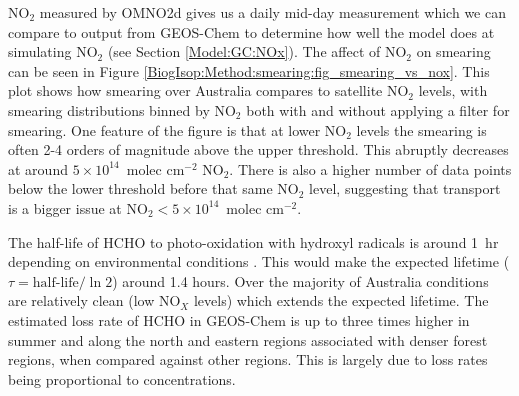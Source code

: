       
      NO$_2$ measured by OMNO2d gives us a daily mid-day measurement which we can compare to output from GEOS-Chem to determine how well the model does at simulating NO$_2$ (see Section \ref{Model:GC:NOx}).
      The affect of NO$_2$ on smearing can be seen in Figure \ref{BiogIsop:Method:smearing:fig_smearing_vs_nox}.
      This plot shows how smearing over Australia compares to satellite NO$_2$ levels, with smearing distributions binned by NO$_2$ both with and without applying a filter for smearing.
      One feature of the figure is that at lower NO$_2$ levels the smearing is often 2-4 orders of magnitude above the upper threshold. 
      This abruptly decreases at around $5 \times 10^{14} $~molec cm$^{-2}$ NO$_2$.
      There is also a higher number of data points below the lower threshold before that same NO$_2$ level, suggesting that transport is a bigger issue at NO$_2 < 5 \times 10^{14} $~molec cm$^{-2}$. 
      
      
      The half-life of HCHO to photo-oxidation with hydroxyl radicals is around 1~hr depending on environmental conditions \parencite{WHO_hcho_guidelines_2010}.
      This would make the expected lifetime ($\tau = \text{half-life}/\ln{2}$) around 1.4 hours.
      Over the majority of Australia conditions are relatively clean (low NO$_X$ levels) which extends the expected lifetime.
      The estimated loss rate of HCHO in GEOS-Chem %
      is up to three times higher in summer and along the north and eastern regions associated with denser forest regions, when compared against other regions.
      This is largely due to loss rates being proportional to concentrations.
      
